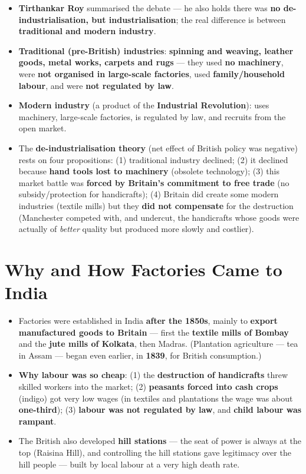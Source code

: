 \begin{KeyConcept}
\begin{itemize}
\item \textbf{Tirthankar Roy} summarised the debate --- he also holds there was \textbf{no de-industrialisation, but industrialisation}; the real difference is between \textbf{traditional and modern industry}.
\item \textbf{Traditional (pre-British) industries}: \textbf{spinning and weaving, leather goods, metal works, carpets and rugs} --- they used \textbf{no machinery}, were \textbf{not organised in large-scale factories}, used \textbf{family/household labour}, and were \textbf{not regulated by law}.
\item \textbf{Modern industry} (a product of the \textbf{Industrial Revolution}): uses machinery, large-scale factories, is regulated by law, and recruits from the open market.
\item The \textbf{de-industrialisation theory} (net effect of British policy was negative) rests on four propositions: (1) traditional industry declined; (2) it declined because \textbf{hand tools lost to machinery} (obsolete technology); (3) this market battle was \textbf{forced by Britain's commitment to free trade} (no subsidy/protection for handicrafts); (4) Britain did create some modern industries (textile mills) but they \textbf{did not compensate} for the destruction (Manchester competed with, and undercut, the handicrafts whose goods were actually of \emph{better} quality but produced more slowly and costlier).
\end{itemize}
\end{KeyConcept}

\section{Why and How Factories Came to India}

\begin{KeyConcept}
\begin{itemize}
\item Factories were established in India \textbf{after the 1850s}, mainly to \textbf{export manufactured goods to Britain} --- first the \textbf{textile mills of Bombay} and the \textbf{jute mills of Kolkata}, then Madras. (Plantation agriculture --- tea in Assam --- began even earlier, in \textbf{1839}, for British consumption.)
\item \textbf{Why labour was so cheap}: (1) the \textbf{destruction of handicrafts} threw skilled workers into the market; (2) \textbf{peasants forced into cash crops} (indigo) got very low wages (in textiles and plantations the wage was about \textbf{one-third}); (3) \textbf{labour was not regulated by law}, and \textbf{child labour was rampant}.
\item The British also developed \textbf{hill stations} --- the seat of power is always at the top (Raisina Hill), and controlling the hill stations gave legitimacy over the hill people --- built by local labour at a very high death rate.
\end{itemize}
\end{KeyConcept}

